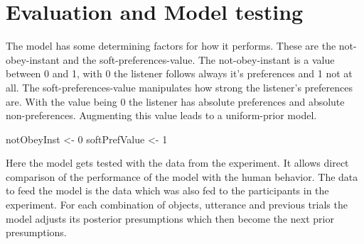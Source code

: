 \documentclass[]{article}
\newenvironment{Shaded}{\begin{snugshade}}{\end{snugshade}}
\newcommand{\DecValTok}[1]{\textcolor[rgb]{0.00,0.00,0.81}{#1}}
\newcommand{\NormalTok}[1]{#1}
\newcommand{\StringTok}[1]{\textcolor[rgb]{0.31,0.60,0.02}{#1}}
\begin{document}
\hypertarget{evaluation-and-model-testing}{%
\section{Evaluation and Model
testing}\label{evaluation-and-model-testing}}

The model has some determining factors for how it performs. These are
the not-obey-instant and the soft-preferences-value. The
not-obey-instant is a value between 0 and 1, with 0 the listener follows
always it's preferences and 1 not at all. The soft-preferences-value
manipulates how strong the listener's preferences are. With the value
being 0 the listener has absolute preferences and absolute
non-preferences. Augmenting this value leads to a uniform-prior model.

\begin{Shaded}
\begin{Highlighting}[]
\NormalTok{notObeyInst <-}\StringTok{ }\DecValTok{0}
\NormalTok{softPrefValue <-}\StringTok{ }\DecValTok{1}
\end{Highlighting}
\end{Shaded}

Here the model gets tested with the data from the experiment. It allows
direct comparison of the performance of the model with the human
behavior. The data to feed the model is the data which was also fed to
the participants in the experiment. For each combination of objects,
utterance and previous trials the model adjusts its posterior
presumptions which then become the next prior presumptions.
\end{document}
